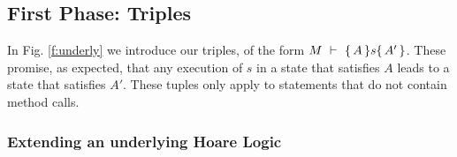 %
%
%
%
%
%
%

\subsection{First Phase: Triples}

In  Fig. \ref{f:underly} we introduce our triples, of the form ${   M\ \vdash\ \{\,A\, \} s \{\,A'\, \}}$. 
These promise, as expected, that any execution of $s$ in a state that satisfies $A$ leads to a state that satisfies $A'$.
These tuples only apply to statements that do not contain method calls.

 
\subsubsection{Extending an underlying Hoare Logic}



